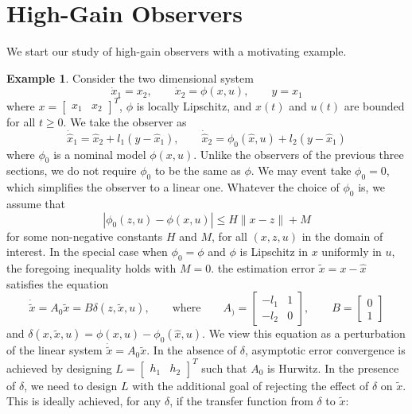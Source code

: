 \documentclass[11pt,a4paper,oneside]{book}
\numberwithin{equation}{section}
\theoremstyle{it}
\theoremstyle{definition}
\newtheorem{example}{Example}[section]
\begin{document}
\section{High-Gain Observers}
We start our study of high-gain observers with a motivating example.
\begin{example}
	Consider the two dimensional system
	\begin{equation*}
		\dot{x}_1=x_2,\qquad\dot{x}_2=\phi(x,u),\qquad y=x_1
	\end{equation*}
	where $x=\begin{bmatrix} x_1&x_2\end{bmatrix}^T$, $\phi$ is locally Lipschitz, and $x(t)$ and $u(t)$ are bounded for all $t\ge0$. We take the observer as
	\begin{equation*}
		\dot{\hat{x}}_1=\hat{x}_2+l_1(y-\hat{x}_1),\qquad\dot{\hat{x}}_2=\phi_0(\hat{x},u)+l_2(y-\hat{x}_1)
	\end{equation*}
	where $\phi_0$ is a nominal model $\phi(x,u)$. Unlike the observers of the previous three sections, we do not require $\phi_0$ to be the same as $\phi$. We may event take $\phi_0=0$, which simplifies the observer to a linear one. Whatever the choice of $\phi_0$ is, we assume that 
	\begin{equation*}
		|\phi_0(z,u)-\phi(x,u)|\le H\|x-z\|+M
	\end{equation*} 
	for some non-negative constants $H$ and $M$, for all $(x,z,u)$ in the domain of interest. In the special case when $\phi_0=\phi$ and $\phi$ is Lipschitz in $x$ uniformly in $u$, the foregoing inequality holds with $M=0$. the estimation error $\tilde{x}=x-\hat{x}$ satisfies the equation
	\begin{equation}
		\dot{\tilde{x}}=A_0\tilde{x}=B\delta(z,\tilde{x},u),\qquad\text{where}\qquad A_)=\begin{bmatrix} -l_1 & 1 \\[6pt] -l_2 & 0 \end{bmatrix},\qquad B=\begin{bmatrix} 0 \\[6pt] 1 \end{bmatrix}
	\end{equation}
	and $\delta(x,\tilde{x},u)=\phi(x,u)-\phi_0(\hat{x},u)$. We view this equation as a perturbation of the linear system $\dot{\tilde{x}}=A_0\tilde{x}$. In the absence of $\delta$, asymptotic error convergence is achieved by designing $L=\begin{bmatrix} h_1&h_2 \end{bmatrix}^T$ such that $A_0$ is Hurwitz. In the presence of $\delta$, we need to design $L$ with the additional goal of rejecting the effect of $\delta$ on $\tilde{x}$. This is ideally achieved, for any $\delta$, if the transfer function from $\delta$ to $\tilde{x}$:

\end{example}
\end{document}
